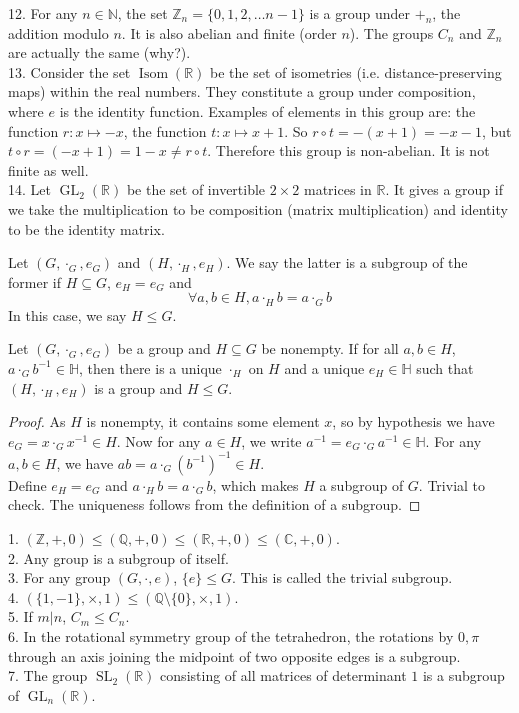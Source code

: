 \begin{example}
    12. For any $n\in\mathbb N$, the set $\mathbb Z_n=\{0,1,2,\ldots n-1\}$ is a group under $+_n$, the addition modulo $n$.
    It is also abelian and finite (order $n$).
    The groups $C_n$ and $\mathbb Z_n$ are actually the same (why?).\\
    13. Consider the set $\operatorname{Isom}(\mathbb R)$ be the set of isometries (i.e. distance-preserving maps) within the real numbers.
    They constitute a group under composition, where $e$ is the identity function.
    Examples of elements in this group are: the function $r:x\mapsto -x$, the function $t:x\mapsto x+1$.
    So $r\circ t=-(x+1)=-x-1$, but $t\circ r=(-x+1)=1-x\neq r\circ t$.
    Therefore this group is non-abelian.
    It is not finite as well.\\
    14. Let $\operatorname{GL}_2(\mathbb R)$ be the set of invertible $2\times 2$ matrices in $\mathbb R$.
    It gives a group if we take the multiplication to be composition (matrix multiplication) and identity to be the identity matrix.
\end{example}
\begin{definition}
    Let $(G,\cdot_G,e_G)$ and $(H,\cdot_H, e_H)$.
    We say the latter is a subgroup of the former if $H\subseteq G$, $e_H=e_G$ and
    $$\forall a,b\in H, a\cdot_Hb=a\cdot_Gb$$
    In this case, we say $H\le G$.
\end{definition}
\begin{proposition}
    Let $(G,\cdot_G,e_G)$ be a group and $H\subseteq G$ be nonempty.
    If for all $a,b\in H$, $a\cdot_Gb^{-1}\in\mathbb H$, then there is a unique $\cdot_H$ on $H$ and a unique $e_H\in\mathbb H$ such that $(H,\cdot_H, e_H)$ is a group and $H\le G$.
\end{proposition}
\begin{proof}
    As $H$ is nonempty, it contains some element $x$, so by hypothesis we have $e_G=x\cdot_Gx^{-1}\in H$.
    Now for any $a\in H$, we write $a^{-1}=e_G\cdot_Ga^{-1}\in\mathbb H$.
    For any $a,b\in H$, we have $ab=a\cdot_G(b^{-1})^{-1}\in H$.\\
    Define $e_H=e_G$ and $a\cdot_Hb=a\cdot_Gb$, which makes $H$ a subgroup of $G$.
    Trivial to check.
    The uniqueness follows from the definition of a subgroup.
\end{proof}
\begin{example}
    1. $(\mathbb Z,+,0)\le(\mathbb Q,+,0)\le(\mathbb R,+,0)\le(\mathbb C,+,0)$.\\
    2. Any group is a subgroup of itself.\\
    3. For any group $(G,\cdot,e)$, $\{e\}\le G$. This is called the trivial subgroup.\\
    4. $(\{1,-1\},\times,1)\le(\mathbb Q\setminus\{0\},\times,1)$.\\
    5. If $m|n$, $C_m\le C_n$.\\
    6. In the rotational symmetry group of the tetrahedron, the rotations by $0,\pi$ through an axis joining the midpoint of two opposite edges is a subgroup.\\
    7. The group $\operatorname{SL}_2(\mathbb R)$ consisting of all matrices of determinant $1$ is a subgroup of $\operatorname{GL}_n(\mathbb R)$.
\end{example}

